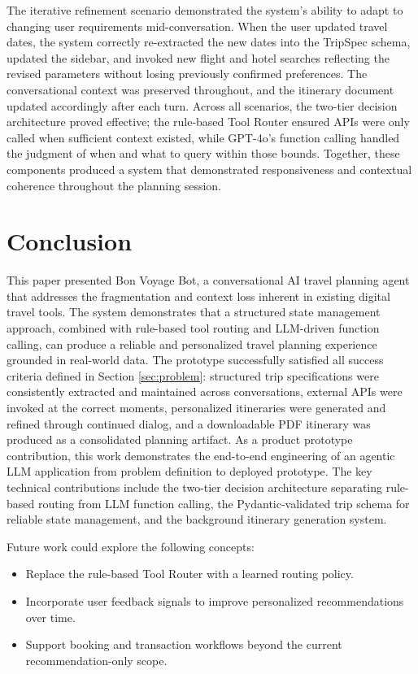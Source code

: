 \documentclass{article}
\begin{document}
The iterative refinement scenario demonstrated the system's ability to adapt to changing user requirements mid-conversation. When the user updated travel dates, the system correctly re-extracted the new dates into the TripSpec schema, updated the sidebar, and invoked new flight and hotel searches reflecting the revised parameters without losing previously confirmed preferences. The conversational context was preserved throughout, and the itinerary document updated accordingly after each turn. Across all scenarios, the two-tier decision architecture proved effective; the rule-based Tool Router ensured APIs were only called when sufficient context existed, while GPT-4o's function calling handled the judgment of when and what to query within those bounds. Together, these components produced a system that demonstrated responsiveness and contextual coherence throughout the planning session.

\section{Conclusion}
\label{sec:conclusion}
This paper presented Bon Voyage Bot, a conversational AI travel planning agent that addresses the fragmentation and context loss inherent in existing digital travel tools. The system demonstrates that a structured state management approach, combined with rule-based tool routing and LLM-driven function calling, can produce a reliable and personalized travel planning experience grounded in real-world data. The prototype successfully satisfied all success criteria defined in Section \ref{sec:problem}: structured trip specifications were consistently extracted and maintained across conversations, external APIs were invoked at the correct moments, personalized itineraries were generated and refined through continued dialog, and a downloadable PDF itinerary was produced as a consolidated planning artifact. As a product prototype contribution, this work demonstrates the end-to-end engineering of an agentic LLM application from problem definition to deployed prototype. The key technical contributions include the two-tier decision architecture separating rule-based routing from LLM function calling, the Pydantic-validated trip schema for reliable state management, and the background itinerary generation system. 

Future work could explore the following concepts: 
\begin{itemize}[noitemsep, topsep=0pt]
    \item Replace the rule-based Tool Router with a learned routing policy.
    \item Incorporate user feedback signals to improve personalized recommendations over time.
    \item Support booking and transaction workflows beyond the current recommendation-only scope.
\end{itemize}
 
\end{document}
